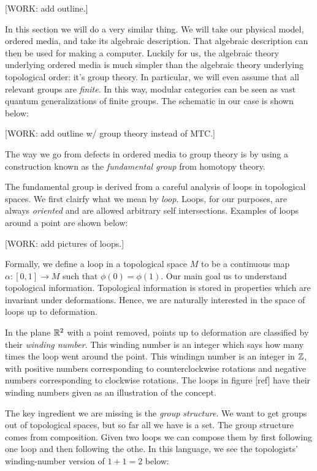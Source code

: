 [WORK: add outline.]

In this section we will do a very similar thing. We will take our physical model, ordered media, and take its algebraic description. That algebraic description can then be used for making a computer. Luckily for us, the algebraic theory underlying ordered media is much simpler than the algebraic theory underlying topological order: it's group theory. In particular, we will even assume that all relevant groups are \textit{finite}. In this way, modular categories can be seen as vast quantum generalizations of finite groups. The schematic in our case is shown below:

[WORK: add outline w/ group theory instead of MTC.]

The way we go from defects in ordered media to group theory is by using a construction known as the \textit{fundamental group} from homotopy theory.

The fundamental group is derived from a careful analysis of loops in topological spaces. We first clairfy what we mean by \textit{loop}. Loops, for our purposes, are always \textit{oriented} and are allowed arbitrary self intersections. Examples of loops around a point are shown below:

[WORK: add pictures of loops.]

Formally, we define a loop in a topological space $M$ to be a continuous map $\alpha:[0,1]\to M$ such that $\phi(0)=\phi(1)$. Our main goal us to understand topological information. Topological information is stored in properties which are invariant under deformations. Hence, we are naturally interested in the space of loops up to deformation.

In the plane $\mathbb{R}^2$ with a point removed, points up to deformation are classified by their \textit{winding number}. This winding number is an integer which says how many times the loop went around the point. This windingn number is an integer in $\mathbb{Z}$, with positive numbers corresponding to counterclockwise rotations and negative numbers corresponding to clockwise rotations. The loops in figure [ref] have their winding numbers given as an illustration of the concept.

The key ingredient we are missing is the \textit{group structure}. We want to get groups out of topological spaces, but so far all we have is a set. The group structure comes from composition. Given two loops we can compose them by first following one loop and then following the othe. In this language, we see the topologists' winding-number version of $1+1=2$ below:

